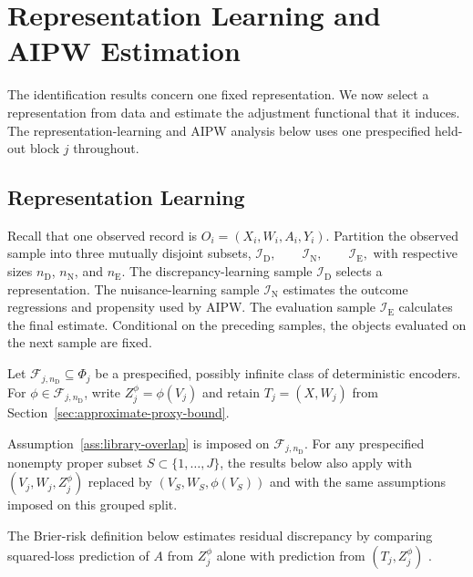 \section{Representation Learning and AIPW Estimation}
\label{app:learning-details}

The identification results concern one fixed representation. We now select a representation from data and estimate the adjustment functional that it induces. The representation-learning and AIPW analysis below uses one prespecified held-out block $j$ throughout.

\subsection{Representation Learning}
\label{sec:representation-learning}

Recall that one observed record is $O_i=(X_i,W_i,A_i,Y_i)$. Partition the observed sample into three mutually disjoint subsets,
\(\mathcal I_{\mathrm D}, \qquad \mathcal I_{\mathrm N}, \qquad \mathcal I_{\mathrm E},\)
with respective sizes $n_{\mathrm D}$, $n_{\mathrm N}$, and $n_{\mathrm E}$. The discrepancy-learning sample $\mathcal I_{\mathrm D}$ selects a representation. The nuisance-learning sample $\mathcal I_{\mathrm N}$ estimates the outcome regressions and propensity used by AIPW. The evaluation sample $\mathcal I_{\mathrm E}$ calculates the final estimate. Conditional on the preceding samples, the objects evaluated on the next sample are fixed.

 Let $\mathcal F_{j,n_{\mathrm D}}\subseteq\Phi_j$ be a prespecified, possibly infinite class of deterministic encoders. For $\phi\in\mathcal F_{j,n_{\mathrm D}}$, write $Z_j^\phi=\phi(V_j)$ and retain $T_j=(X,W_j)$ from Section~\ref{sec:approximate-proxy-bound}.

Assumption~\ref{ass:library-overlap} is imposed on $\mathcal F_{j,n_{\mathrm D}}$.
For any prespecified nonempty proper subset $S\subset\{1,\ldots,J\}$, the results below also apply with $(V_j,W_j,Z_j^\phi)$ replaced by $(V_S,W_S,\phi(V_S))$ and with the same assumptions imposed on this grouped split.

The Brier-risk definition below estimates residual discrepancy by comparing squared-loss prediction of $A$ from $Z_j^\phi$ alone with prediction from $(T_j,Z_j^\phi)$ \citep{brier1950verification}.

